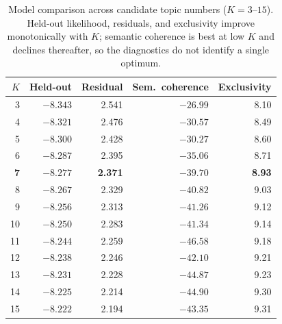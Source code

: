 \documentclass[11pt]{article}
\begin{document}
\begin{table}[htbp]
\centering
\caption{Model comparison across candidate topic numbers ($K=3$--$15$). Held-out
likelihood, residuals, and exclusivity improve monotonically with $K$; semantic
coherence is best at low $K$ and declines thereafter, so the diagnostics do not
identify a single optimum.}
\label{tab:modelcomp}
\small
\begin{tabular}{r r r r r}
\toprule
$K$ & Held-out & Residual & Sem.\ coherence & Exclusivity \\
\midrule
3  & $-8.343$ & 2.541 & $-26.99$ & 8.10 \\
4  & $-8.321$ & 2.476 & $-30.57$ & 8.49 \\
5  & $-8.300$ & 2.428 & $-30.27$ & 8.60 \\
6  & $-8.287$ & 2.395 & $-35.06$ & 8.71 \\
\textbf{7} & $\mathbf{-8.277}$ & \textbf{2.371} & $\mathbf{-39.70}$ & \textbf{8.93} \\
8  & $-8.267$ & 2.329 & $-40.82$ & 9.03 \\
9  & $-8.256$ & 2.313 & $-41.26$ & 9.12 \\
10 & $-8.250$ & 2.283 & $-41.34$ & 9.14 \\
11 & $-8.244$ & 2.259 & $-46.58$ & 9.18 \\
12 & $-8.238$ & 2.246 & $-42.10$ & 9.21 \\
13 & $-8.231$ & 2.228 & $-44.87$ & 9.23 \\
14 & $-8.225$ & 2.214 & $-44.90$ & 9.30 \\
15 & $-8.222$ & 2.194 & $-43.35$ & 9.31 \\
\bottomrule
\end{tabular}
\end{table}
\end{document}
